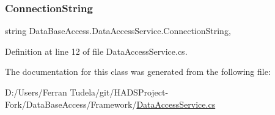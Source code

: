 \subsubsection{\texorpdfstring{ConnectionString}{ConnectionString}}
{\footnotesize\ttfamily string Data\+Base\+Access.\+Data\+Access\+Service.\+Connection\+String\hspace{0.3cm}{\ttfamily [get]}, {}}



Definition at line 12 of file Data\+Access\+Service.\+cs.



The documentation for this class was generated from the following file\+:\begin{DoxyCompactItemize}
\item 
D\+:/\+Users/\+Ferran Tudela/git/\+H\+A\+D\+S\+Project-\/\+Fork/\+Data\+Base\+Access/\+Framework/\mbox{\hyperlink{DataAccessService_8cs}{Data\+Access\+Service.\+cs}}\end{DoxyCompactItemize}

